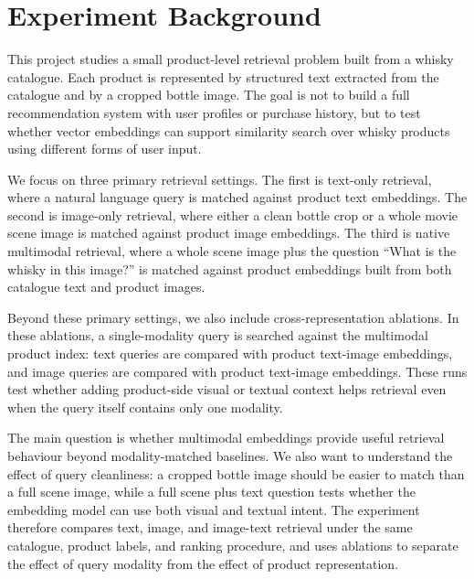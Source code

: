 \section{Experiment Background}

This project studies a small product-level retrieval problem built from a whisky catalogue. Each product is represented by structured text extracted from the catalogue and by a cropped bottle image. The goal is not to build a full recommendation system with user profiles or purchase history, but to test whether vector embeddings can support similarity search over whisky products using different forms of user input.

We focus on three primary retrieval settings. The first is text-only retrieval, where a natural language query is matched against product text embeddings. The second is image-only retrieval, where either a clean bottle crop or a whole movie scene image is matched against product image embeddings. The third is native multimodal retrieval, where a whole scene image plus the question ``What is the whisky in this image?'' is matched against product embeddings built from both catalogue text and product images.

Beyond these primary settings, we also include cross-representation ablations. In these ablations, a single-modality query is searched against the multimodal product index: text queries are compared with product text-image embeddings, and image queries are compared with product text-image embeddings. These runs test whether adding product-side visual or textual context helps retrieval even when the query itself contains only one modality.

The main question is whether multimodal embeddings provide useful retrieval behaviour beyond modality-matched baselines. We also want to understand the effect of query cleanliness: a cropped bottle image should be easier to match than a full scene image, while a full scene plus text question tests whether the embedding model can use both visual and textual intent. The experiment therefore compares text, image, and image-text retrieval under the same catalogue, product labels, and ranking procedure, and uses ablations to separate the effect of query modality from the effect of product representation.
